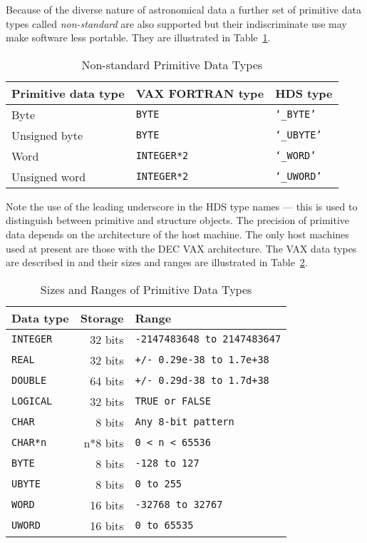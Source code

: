 Because of the diverse nature of astronomical data a further set of primitive
data types called {\em non-standard} are also supported but their
indiscriminate use may make software less portable. They are illustrated
in Table~\ref{non_standard_primitive_data_types}.

\begin {table}[htbp]
\begin {center}
\begin {tabular}{||l|l|l||}
\hline
Primitive data type	& VAX FORTRAN type	& HDS type \\
\hline
Byte			& {\tt BYTE}		& {\tt `\_BYTE'} \\
Unsigned byte		& {\tt BYTE}		& {\tt `\_UBYTE'} \\
Word			& {\tt INTEGER*2}	& {\tt `\_WORD'} \\
Unsigned word		& {\tt INTEGER*2}	& {\tt `\_UWORD'} \\
\hline
\end {tabular}
\caption {Non-standard Primitive Data Types}
\label {non_standard_primitive_data_types}
\end {center}
\end {table}

Note the use of the leading underscore in the HDS type names --- this is used
to distinguish between primitive and structure objects. The precision of
primitive data depends on the architecture of the host machine. The only host
machines used at present are those with the DEC VAX architecture. The VAX data
types are described in \cite{programming_in_fortran} and their sizes and ranges
are illustrated in Table~\ref{sizes_and_ranges_of_primitive_data_types}.

\begin {table}[htbp]
\begin {center}
\begin {tabular}{||l|r|l||}
\hline
Data type	& Storage	& Range \\
\hline
{\tt INTEGER}	& 32 bits	& {\tt -2147483648 to 2147483647} \\
{\tt REAL}	& 32 bits	& {\tt +/- 0.29e-38 to 1.7e+38} \\
{\tt DOUBLE}	& 64 bits	& {\tt +/- 0.29d-38 to 1.7d+38} \\
{\tt LOGICAL}	& 32 bits	& {\tt TRUE or FALSE} \\
{\tt CHAR}	& 8 bits	& {\tt Any 8-bit pattern} \\
{\tt CHAR*n}	& n*8 bits	& {\tt 0 < n < 65536} \\
\hline
{\tt BYTE}	& 8 bits	& {\tt -128 to 127} \\
{\tt UBYTE}	& 8 bits	& {\tt 0 to 255} \\
{\tt WORD}	& 16 bits	& {\tt -32768 to 32767} \\
{\tt UWORD}	& 16 bits	& {\tt 0 to 65535} \\
\hline
\end {tabular}
\caption {Sizes and Ranges of Primitive Data Types}
\label {sizes_and_ranges_of_primitive_data_types}
\end {center}
\end {table}

